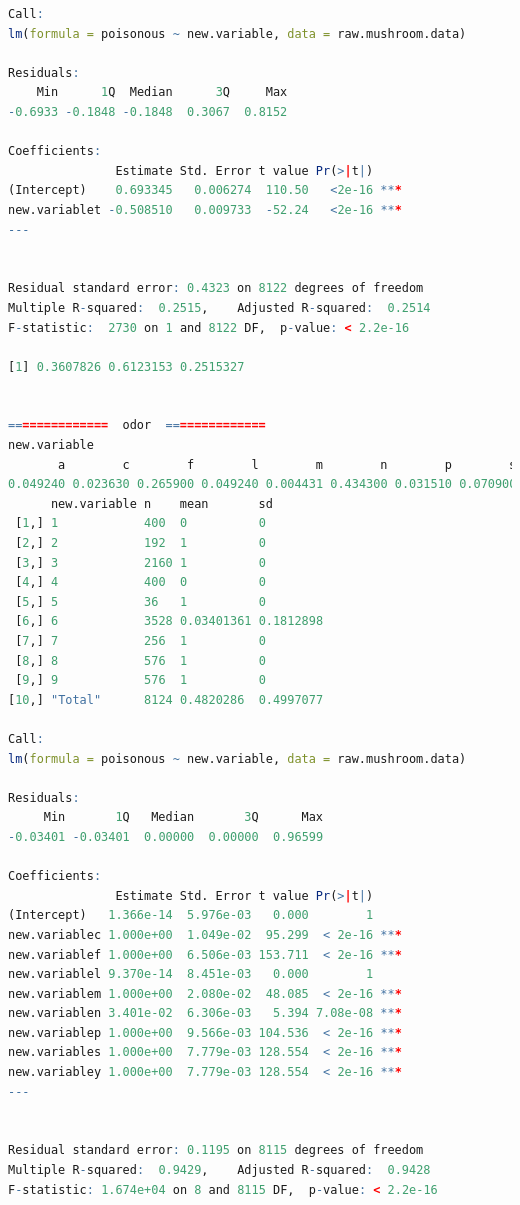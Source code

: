 \documentclass[12pt]{article}
\begin{document}
\begin{lstlisting}[language = R]
Call:
lm(formula = poisonous ~ new.variable, data = raw.mushroom.data)

Residuals:
    Min      1Q  Median      3Q     Max 
-0.6933 -0.1848 -0.1848  0.3067  0.8152 

Coefficients:
               Estimate Std. Error t value Pr(>|t|)    
(Intercept)    0.693345   0.006274  110.50   <2e-16 ***
new.variablet -0.508510   0.009733  -52.24   <2e-16 ***
---


Residual standard error: 0.4323 on 8122 degrees of freedom
Multiple R-squared:  0.2515,	Adjusted R-squared:  0.2514 
F-statistic:  2730 on 1 and 8122 DF,  p-value: < 2.2e-16

[1] 0.3607826 0.6123153 0.2515327


==============  odor  ==============
new.variable
       a        c        f        l        m        n        p        s        y     <NA> 
0.049240 0.023630 0.265900 0.049240 0.004431 0.434300 0.031510 0.070900 0.070900 0.000000 
      new.variable n    mean       sd       
 [1,] 1            400  0          0        
 [2,] 2            192  1          0        
 [3,] 3            2160 1          0        
 [4,] 4            400  0          0        
 [5,] 5            36   1          0        
 [6,] 6            3528 0.03401361 0.1812898
 [7,] 7            256  1          0        
 [8,] 8            576  1          0        
 [9,] 9            576  1          0        
[10,] "Total"      8124 0.4820286  0.4997077

Call:
lm(formula = poisonous ~ new.variable, data = raw.mushroom.data)

Residuals:
     Min       1Q   Median       3Q      Max 
-0.03401 -0.03401  0.00000  0.00000  0.96599 

Coefficients:
               Estimate Std. Error t value Pr(>|t|)    
(Intercept)   1.366e-14  5.976e-03   0.000        1    
new.variablec 1.000e+00  1.049e-02  95.299  < 2e-16 ***
new.variablef 1.000e+00  6.506e-03 153.711  < 2e-16 ***
new.variablel 9.370e-14  8.451e-03   0.000        1    
new.variablem 1.000e+00  2.080e-02  48.085  < 2e-16 ***
new.variablen 3.401e-02  6.306e-03   5.394 7.08e-08 ***
new.variablep 1.000e+00  9.566e-03 104.536  < 2e-16 ***
new.variables 1.000e+00  7.779e-03 128.554  < 2e-16 ***
new.variabley 1.000e+00  7.779e-03 128.554  < 2e-16 ***
---


Residual standard error: 0.1195 on 8115 degrees of freedom
Multiple R-squared:  0.9429,	Adjusted R-squared:  0.9428 
F-statistic: 1.674e+04 on 8 and 8115 DF,  p-value: < 2.2e-16


\end{lstlisting}
\end{document}
